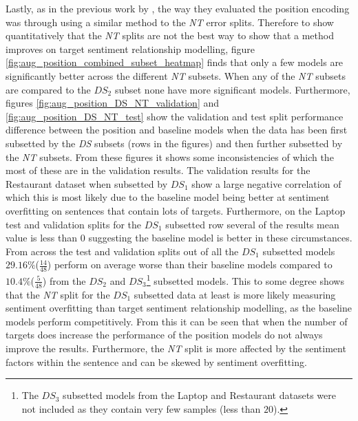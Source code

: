 Lastly, as in the previous work by \citet{he-etal-2018-effective}, the way they evaluated the position encoding was through using a similar method to the \textit{NT} error splits. Therefore to show quantitatively that the \textit{NT} splits are not the best way to show that a method improves on target sentiment relationship modelling, figure \ref{fig:aug_position_combined_subset_heatmap} finds that only a few models are significantly better across the different \textit{NT} subsets. When any of the \textit{NT} subsets are compared to the $DS_2$ subset none have more significant models. Furthermore, figures \ref{fig:aug_position_DS_NT_validation} and \ref{fig:aug_position_DS_NT_test} show the validation and test split performance difference between the position and baseline models when the data has been first subsetted by the \textit{DS} subsets (rows in the figures) and then further subsetted by the \textit{NT} subsets. From these figures it shows some inconsistencies of which the most of these are in the validation results. The validation results for the Restaurant dataset when subsetted by $DS_1$ show a large negative correlation of which this is most likely due to the baseline model being better at sentiment overfitting on sentences that contain lots of targets. Furthermore, on the Laptop test and validation splits for the $DS_1$ subsetted row several of the results mean value is less than $0$ suggesting the baseline model is better in these circumstances. From across the test and validation splits out of all the $DS_1$ subsetted models $29.16\%$($\frac{14}{48}$) perform on average worse than their baseline models compared to $10.4\%$($\frac{5}{48}$) from the $DS_2$ and $DS_3$\footnote{The $DS_3$ subsetted models from the Laptop and Restaurant datasets were not included as they contain very few samples (less than $20$).} subsetted models. This to some degree shows that the \textit{NT} split for the $DS_1$ subsetted data at least is more likely measuring sentiment overfitting than target sentiment relationship modelling, as the baseline models perform competitively. From this it can be seen that when the number of targets does increase the performance of the position models do not always improve the results. Furthermore, the \textit{NT} split is more affected by the sentiment factors within the sentence and can be skewed by sentiment overfitting.

